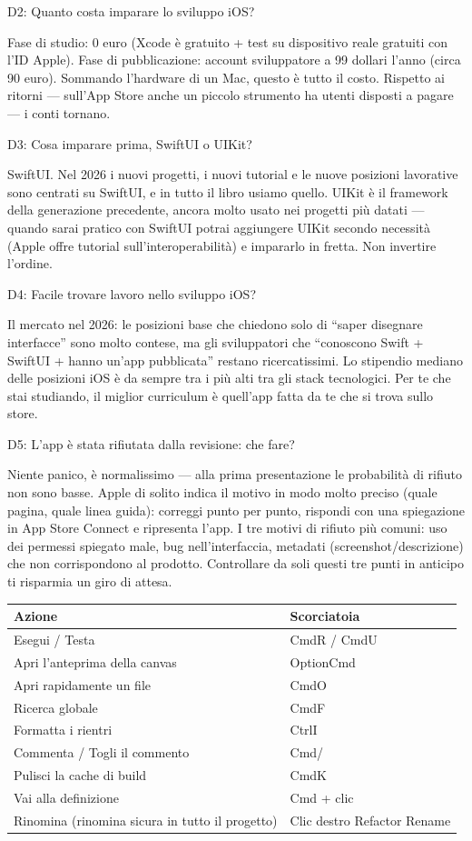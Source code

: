 D2: Quanto costa imparare lo sviluppo iOS?

Fase di studio: 0 euro (Xcode è gratuito + test su dispositivo reale gratuiti con l'ID Apple). Fase di pubblicazione: account sviluppatore a 99 dollari l'anno (circa 90 euro). Sommando l'hardware di un Mac, questo è tutto il costo. Rispetto ai ritorni — sull'App Store anche un piccolo strumento ha utenti disposti a pagare — i conti tornano.

D3: Cosa imparare prima, SwiftUI o UIKit?

SwiftUI. Nel 2026 i nuovi progetti, i nuovi tutorial e le nuove posizioni lavorative sono centrati su SwiftUI, e in tutto il libro usiamo quello. UIKit è il framework della generazione precedente, ancora molto usato nei progetti più datati — quando sarai pratico con SwiftUI potrai aggiungere UIKit secondo necessità (Apple offre tutorial sull'interoperabilità) e impararlo in fretta. Non invertire l'ordine.

D4: Facile trovare lavoro nello sviluppo iOS?

Il mercato nel 2026: le posizioni base che chiedono solo di “saper disegnare interfacce” sono molto contese, ma gli sviluppatori che “conoscono Swift + SwiftUI + hanno un'app pubblicata” restano ricercatissimi. Lo stipendio mediano delle posizioni iOS è da sempre tra i più alti tra gli stack tecnologici. Per te che stai studiando, il miglior curriculum è quell'app fatta da te che si trova sullo store.

D5: L'app è stata rifiutata dalla revisione: che fare?

Niente panico, è normalissimo — alla prima presentazione le probabilità di rifiuto non sono basse. Apple di solito indica il motivo in modo molto preciso (quale pagina, quale linea guida): correggi punto per punto, rispondi con una spiegazione in App Store Connect e ripresenta l'app. I tre motivi di rifiuto più comuni: uso dei permessi spiegato male, bug nell'interfaccia, metadati (screenshot/descrizione) che non corrispondono al prodotto. Controllare da soli questi tre punti in anticipo ti risparmia un giro di attesa.


\begin{center}
\begin{tabularx}{\linewidth}{|X|X|}
\hline
\textbf{Azione} & \textbf{Scorciatoia} \tabularnewline
\hline
Esegui / Testa & CmdR / CmdU \tabularnewline
Apri l'anteprima della canvas & OptionCmd \tabularnewline
Apri rapidamente un file & CmdO \tabularnewline
Ricerca globale & CmdF \tabularnewline
Formatta i rientri & CtrlI \tabularnewline
Commenta / Togli il commento & Cmd/ \tabularnewline
Pulisci la cache di build & CmdK \tabularnewline
Vai alla definizione & Cmd + clic \tabularnewline
Rinomina (rinomina sicura in tutto il progetto) & Clic destro Refactor Rename \tabularnewline
\hline
\end{tabularx}
\end{center}

